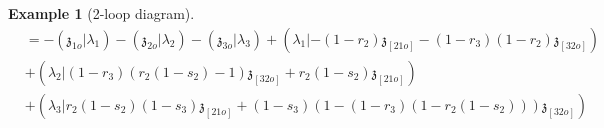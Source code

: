 \documentclass[11pt]{amsart}
\newcommand{\agraphW}{
  \mathbf{W}_{\tikz[baseline=-0.5ex]{
      \coordinate (A) at (0,0);
      \coordinate (B) at (2mm,0);
      \coordinate (C) at (1mm,1mm);
      \coordinate (D) at (1mm,-1mm);

      \fill (A) circle (0.25mm);
      \fill (B) circle (0.25mm);
      \fill (C) circle (0.25mm);
      \fill (D) circle (0.25mm);

      \draw (A) -- (C);
      \draw (A) -- (D);
      \draw (C) -- (D);
      \draw (B) -- (C);
      \draw (B) -- (D);
  }}
}
\newcommand{\triangleW}{
  \mathbf{W}_{\tikz[baseline=-0.5ex]{\node[regular polygon, regular polygon sides=3, inner sep=0pt, draw, minimum size=2mm] (triangle) {};
      \fill (triangle.corner 1) circle (0.25mm);
      \fill (triangle.corner 2) circle (0.25mm);
      \fill (triangle.corner 3) circle (0.25mm);}}
}
\theoremstyle{definition}
\newtheorem{exa}[thm]{Example}
\theoremstyle{remark}
\numberwithin{equation}{section}
\begin{document}
\begin{exa}[2-loop diagram]
\begin{align*}
&=-(\mathfrak{z}_{1o}|\lambda_1)-(\mathfrak{z}_{2o}|\lambda_2)-\left(\mathfrak{z}_{3o}|\lambda_{3}\right)+\left(\lambda_1|-(1-r_{2})\mathfrak{z}_{[2 1o]}-(1-r_3)(1-r_2)\mathfrak{z}_{[32o]}\right)\\
&+\left(\lambda_2|(1-r_{3})(r_2(1-s_2)-1)\mathfrak{z}_{[3 2o]}+r_2(1-s_2)\mathfrak{z}_{[2 1o]}\right)\\
&+\left(\lambda_3|r_2(1-s_2)(1-s_3)\mathfrak{z}_{[21o]}+(1-s_3)(1-(1-r_3)(1-r_2(1-s_2)))\mathfrak{z}_{[32o]}\right)\\
\end{align*}
\fi
\iffalse
  Let
  $$
t_1=r_2(1-s_2),t_3=(1-r_3)(1-t_1),\tilde{s}_1=\frac{(1-r_2)}{1-r_2(1-s_2)}=\frac{1-r_2}{1-t_1},\tilde{s}_3=1-s_3.
$$
$$
r_2=1-\tilde{s}_1(1-t_1),1-s_2=\frac{t_1}{1-\tilde{s}_1(1-t_1)}, 1-r_3=\frac{t_3}{1-t_1}.
$$
Then
\begin{align*}
      \agraphW &=-(\mathfrak{z}_{1o}|\lambda_1)-(\mathfrak{z}_{2o}|\lambda_2)-\left(\mathfrak{z}_{3o}|\lambda_{3}\right)+\left(\lambda_1|-\tilde{s}_1(1-t_1)\mathfrak{z}_{[2 1o]}+\tilde{s}_1t_3\mathfrak{z}_{[23o]}\right)\\
&+\left(\lambda_2|t_3\mathfrak{z}_{[23o]}+t_1\mathfrak{z}_{[2 1o]}\right)+\left(\lambda_3|t_1\tilde{s}_3\mathfrak{z}_{[21o]}-\tilde{s}_3(1-t_3)\mathfrak{z}_{[32o]}\right)\\
\end{align*}
\begin{align*}
  &( \partial_{\mathfrak{z}_{2o}}\triangleW)\wedge\lambda_3  \cdot r_2r_3dr_2ds_2dr_3ds_3\\
  &=\left((\tilde{s}_1\lambda_1+\lambda_2)\wedge\lambda_3 \right)\cdot (1-t_1)(1-\tilde{s}_1(1-t_1))(1-\frac{t_3}{1-t_1})d(1-\tilde{s}_1(1-t_1))d(\frac{t_1}{1-\tilde{s}_1(1-t_1)})d(\frac{t_3}{1-t_1})ds_3\\
   & =\left((\tilde{s}_1\lambda_1+\lambda_2)\wedge\lambda_3 \right)\cdot (1-t_1)(1-\frac{t_3}{1-t_1})d(1-\tilde{s}_1(1-t_1))dt_1d(\frac{t_3}{1-t_1})ds_3\\
   &=\left((\tilde{s}_1\lambda_1+\lambda_2)\wedge\lambda_3 \right)\cdot(1-t_1-t_3)d\tilde{s}_1dt_1dt_3ds_3.
\end{align*}
Finally
\begin{align*}
&\int_{\Delta_2\times\Delta_1\times\Delta_1}(1-t_3-t_1)\cdot(\lambda_3\wedge(s_1\lambda_1+\lambda_2))\cdot (\lambda_1\wedge(s_3\lambda_3+\lambda_2)) \cdot dt_1dt_3ds_1ds_3\\
&=\frac{1}{6}(\lambda_3\wedge(\frac{1}{2}\lambda_1+\lambda_2))\cdot (\lambda_1\wedge(\frac{1}{2}\lambda_3+\lambda_2))\\
&=\frac{1}{24}(\lambda_3\wedge(\lambda_1+2\lambda_2))\cdot (\lambda_1\wedge(\lambda_3+2\lambda_2)).
      \end{align*}
      \fi
\end{exa}
\end{document}
